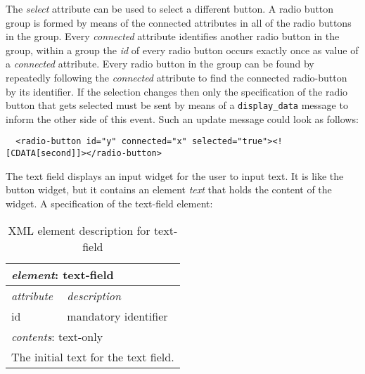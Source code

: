 \documentclass{article}
\newcommand{\msg}[1]{\texttt{#1}}
\begin{document}
   \noindent The \textit{select} attribute can be used to select a different button. A
   radio button group is formed by means of the connected attributes in all of
   the radio buttons in the group. Every \textit{connected} attribute
   identifies another radio button in the group, within a group the \textit{id}
   of every radio button occurs exactly once as value of a \textit{connected}
   attribute.  Every radio button in the group can be found by repeatedly
   following the \textit{connected} attribute to find the connected
   radio-button by its identifier. If the selection changes then only the
   specification of the radio button that gets selected must be sent by means
   of a \msg{display\_data} message to inform the other side of this event.
   Such an update message could look as follows:

    \small \begin{verbatim}
  <radio-button id="y" connected="x" selected="true"><![CDATA[second]]></radio-button>\end{verbatim}
  \normalsize

   \noindent The text field displays an input widget for the user to input text. It is
   like the button widget, but it contains an element \textit{text} that
   holds the content of the widget. A specification of the text-field element:
   
    \begin{table}[H]
     \begin{center}
     \begin{tabular}{|l|l|}
       \hline
        \multicolumn{2}{|l|}{\textit{element}: text-field} \\
       \hline \hline
        \textit{attribute} & \textit{description} \\
       \hline
        id                 & mandatory identifier \\
       \hline \hline
        \multicolumn{2}{|l|}{\textit{contents}: text-only} \\
       \hline
         \multicolumn{2}{|l|}{The initial text for the text field.} \\
       \hline
     \end{tabular}
     \end{center}
     \label{figure:element_text_field}
     \caption{XML element description for text-field}
    \end{table}

\end{document}
